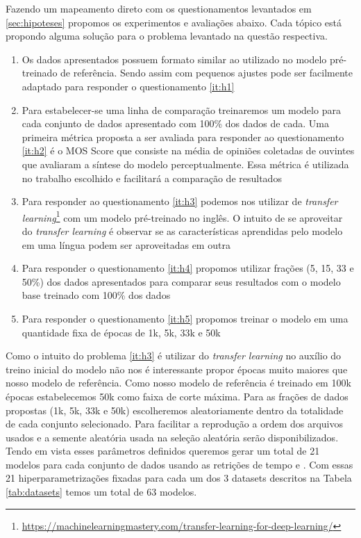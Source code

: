 \documentclass{article}
\begin{document}
Fazendo um mapeamento direto com os questionamentos levantados em \ref{sec:hipoteses} propomos os experimentos e avaliações abaixo.
Cada tópico está propondo alguma solução para o problema levantado na questão respectiva. 
\begin{enumerate}
	\item Os dados apresentados possuem formato similar ao utilizado no modelo pré-treinado de referência. 
	Sendo assim com pequenos ajustes pode ser facilmente adaptado para responder o questionamento \ref{it:h1}
	\item Para estabelecer-se uma linha de comparação treinaremos um modelo para cada conjunto de dados apresentado com 100\% dos dados de cada.
	Uma primeira métrica proposta a ser avaliada para responder ao questionamento \ref{it:h2} é o MOS Score que consiste na média de opiniões coletadas de ouvintes que avaliaram a síntese do modelo perceptualmente.
	Essa métrica é utilizada no trabalho escolhido e facilitará a comparação de resultados
	\item Para responder ao questionamento \ref{it:h3} podemos nos utilizar de \textit{transfer learning}\footnote{\url{https://machinelearningmastery.com/transfer-learning-for-deep-learning/}} com um modelo pré-treinado no inglês.
	O intuito de se aproveitar do \textit{transfer learning} é observar se as características aprendidas pelo modelo em uma língua podem ser aproveitadas em outra
	\item Para responder o questionamento \ref{it:h4} propomos utilizar frações (5, 15, 33 e 50\%) dos dados apresentados para comparar seus resultados com o modelo base treinado com 100\% dos dados
	\item Para responder o questionamento \ref{it:h5} propomos treinar o modelo em uma quantidade fixa de épocas de 1k, 5k, 33k e 50k
\end{enumerate}

Como o intuito do problema \ref{it:h3} é utilizar do \textit{transfer learning} no auxílio do treino inicial do modelo não nos é interessante propor épocas muito maiores que nosso modelo de referência. 
Como nosso modelo de referência é treinado em 100k épocas estabelecemos 50k como faixa de corte máxima. 
Para as frações de dados propostas (1k, 5k, 33k e 50k) escolheremos aleatoriamente dentro da totalidade de cada conjunto selecionado.
Para facilitar a reprodução a ordem dos arquivos usados e a semente aleatória usada na seleção aleatória serão disponibilizados.
Tendo em vista esses parâmetros definidos queremos gerar um total de 21 modelos para cada conjunto de dados usando as retrições de tempo e .
Com essas 21 hiperparametrizações fixadas para cada um dos 3 datasets descritos na Tabela \ref{tab:datasets} temos um total de 63 modelos. 
\end{document}
